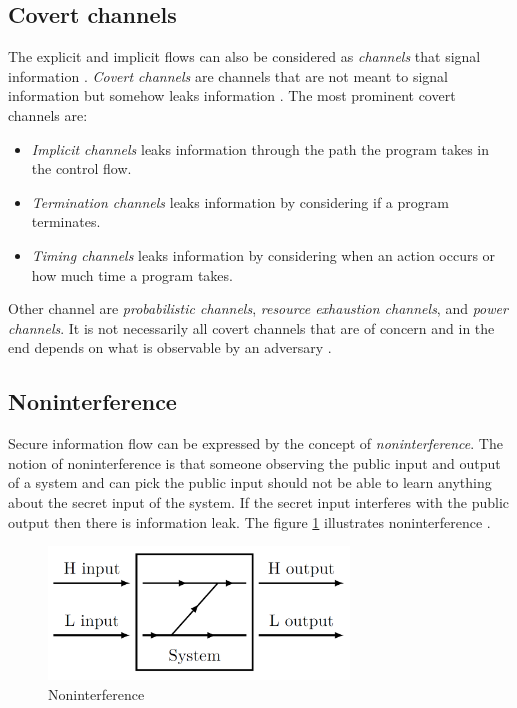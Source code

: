\subsection{Covert channels} The explicit and implicit flows can also be considered as \emph{channels} that signal information \cite{Kashyap2011} \cite{Sabelfeld2003}. \emph{Covert channels} are channels that are not meant to signal information but somehow leaks information \cite{Kashyap2011}. The most prominent covert channels are: 
\begin{itemize}
	\item \emph{Implicit channels} leaks information through the path the program takes in the control flow.
	\item \emph{Termination channels} leaks information by considering if a program terminates.
	\item \emph{Timing channels} leaks information by considering when an action occurs or how much time a program takes.
\end{itemize}

Other channel are \emph{probabilistic channels}, \emph{resource exhaustion channels}, and \emph{power channels}. It is not necessarily all covert channels that are of concern and in the end depends on what is observable by an adversary \cite{Sabelfeld2003}.

\subsection{Noninterference}
Secure information flow can be expressed by the concept of \emph{noninterference}. The notion of noninterference is that someone observing the public input and output of a system and can pick the public input should not be able to learn anything about the secret input of the system. If the secret input interferes with the public output then there is information leak. The figure \ref{fig:noninterference} illustrates noninterference \cite{Hedin2011}.  



\begin{figure}[H]
	\centering
	\includegraphics[width=8cm]{figures/noninterference2.png}
	\caption{ Noninterference \cite{Musard2014}}
	\label{fig:noninterference}
\end{figure}

